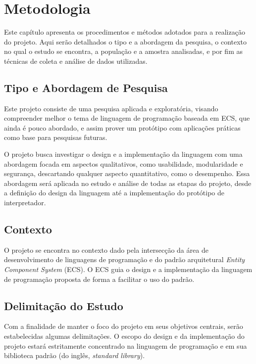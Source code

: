 \chapter{Metodologia}\label{ch:metodologia}

Este capítulo apresenta os procedimentos e métodos adotados para a realização do projeto. Aqui serão detalhados o tipo e a abordagem da pesquisa, o contexto no qual o estudo se encontra, a população e a amostra analisadas, e por fim as técnicas de coleta e análise de dados utilizadas.

\section{Tipo e Abordagem de Pesquisa}

Este projeto consiste de uma pesquisa aplicada e exploratória, visando compreender melhor o tema de linguagem de programação baseada em ECS, que ainda é pouco abordado, e assim prover um protótipo com aplicações práticas como base para pesquisas futuras.

O projeto busca investigar o design e a implementação da linguagem com uma abordagem focada em aspectos qualitativos, como usabilidade, modularidade e segurança, descartando qualquer aspecto quantitativo, como o desempenho. Essa abordagem será aplicada no estudo e análise de todas as etapas do projeto, desde a definição do design da linguagem até a implementação do protótipo de interpretador.

\section{Contexto}

O projeto se encontra no contexto dado pela intersecção da área de desenvolvimento de linguagens de programação e do padrão arquitetural \textit{Entity Component System} (ECS). O ECS guia o design e a implementação da linguagem de programação proposta de forma a facilitar o uso do padrão.

\section{Delimitação do Estudo}

Com a finalidade de manter o foco do projeto em seus objetivos centrais, serão estabelecidas algumas delimitações. O escopo do design e da implementação do projeto estará estritamente concentrado na linguagem de programação e em sua biblioteca padrão (do inglês, \textit{standard library}).

